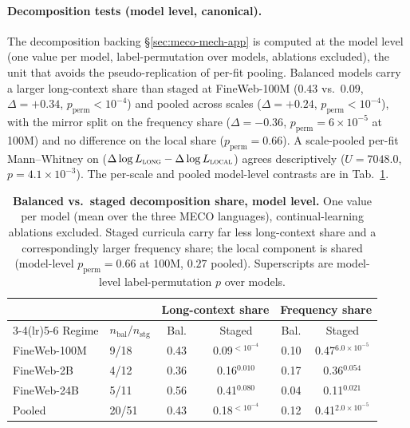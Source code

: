 \paragraph{Decomposition tests (model level, canonical).} The decomposition backing \S\ref{sec:meco-mech-app} is computed at the model level (one value per model, label-permutation over models, ablations excluded), the unit that avoids the pseudo-replication of per-fit pooling. Balanced models carry a larger long-context share than staged at FineWeb-100M ($0.43$ vs.\ $0.09$, $\Delta{=}{+}0.34$, $p_\text{perm}{<}10^{-4}$) and pooled across scales ($\Delta{=}{+}0.24$, $p_\text{perm}{<}10^{-4}$), with the mirror split on the frequency share ($\Delta{=}{-}0.36$, $p_\text{perm}{=}6{\times}10^{-5}$ at 100M) and no difference on the local share ($p_\text{perm}{=}0.66$). A scale-pooled per-fit Mann--Whitney on ($\Delta\log L_\textsc{long}-\Delta\log L_\textsc{local}$) agrees descriptively ($U{=}7048.0$, $p{=}4.1{\times}10^{-3}$). The per-scale and pooled model-level contrasts are in Tab.~\ref{tab:sig_decomp_curriculum}.
 
\begin{table}[!ht]
  \centering \small
  \caption{\textbf{Balanced vs.\ staged decomposition share, model level.} One value per model (mean over the three MECO languages), continual-learning ablations excluded. Staged curricula carry far less long-context share and a correspondingly larger frequency share; the local component is shared (model-level $p_\text{perm}{=}0.66$ at 100M, $0.27$ pooled). Superscripts are model-level label-permutation $p$ over models.}
  \label{tab:sig_decomp_curriculum}
  \begin{tabular}{llcccc}
    \toprule
     & & \multicolumn{2}{c}{Long-context share} & \multicolumn{2}{c}{Frequency share} \\
    \cmidrule(lr){3-4}\cmidrule(lr){5-6}
    Regime & $n_{\text{bal}}/n_{\text{stg}}$ & Bal. & Staged & Bal. & Staged \\
    \midrule
    FineWeb-100M & 9/18 & 0.43 & 0.09${}^{<10^{-4}}$ & 0.10 & 0.47${}^{6.0\times10^{-5}}$ \\
    FineWeb-2B & 4/12 & 0.36 & 0.16${}^{0.010}$ & 0.17 & 0.36${}^{0.054}$ \\
    FineWeb-24B & 5/11 & 0.56 & 0.41${}^{0.080}$ & 0.04 & 0.11${}^{0.021}$ \\
    Pooled & 20/51 & 0.43 & 0.18${}^{<10^{-4}}$ & 0.12 & 0.41${}^{2.0\times10^{-5}}$ \\
    \bottomrule
  \end{tabular}
\end{table}
 
